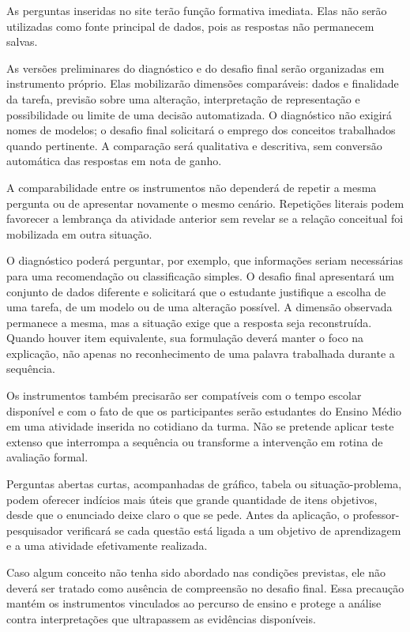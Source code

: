 As perguntas inseridas no site terão função formativa imediata. Elas não serão utilizadas como fonte principal de dados, pois as respostas não permanecem salvas.

As versões preliminares do diagnóstico e do desafio final serão organizadas em instrumento próprio. Elas mobilizarão dimensões comparáveis: dados e finalidade da tarefa, previsão sobre uma alteração, interpretação de representação e possibilidade ou limite de uma decisão automatizada. O diagnóstico não exigirá nomes de modelos; o desafio final solicitará o emprego dos conceitos trabalhados quando pertinente. A comparação será qualitativa e descritiva, sem conversão automática das respostas em nota de ganho.

A comparabilidade entre os instrumentos não dependerá de repetir a mesma pergunta ou de apresentar novamente o mesmo cenário. Repetições literais podem favorecer a lembrança da atividade anterior sem revelar se a relação conceitual foi mobilizada em outra situação.

O diagnóstico poderá perguntar, por exemplo, que informações seriam necessárias para uma recomendação ou classificação simples. O desafio final apresentará um conjunto de dados diferente e solicitará que o estudante justifique a escolha de uma tarefa, de um modelo ou de uma alteração possível. A dimensão observada permanece a mesma, mas a situação exige que a resposta seja reconstruída. Quando houver item equivalente, sua formulação deverá manter o foco na explicação, não apenas no reconhecimento de uma palavra trabalhada durante a sequência.

Os instrumentos também precisarão ser compatíveis com o tempo escolar disponível e com o fato de que os participantes serão estudantes do Ensino Médio em uma atividade inserida no cotidiano da turma. Não se pretende aplicar teste extenso que interrompa a sequência ou transforme a intervenção em rotina de avaliação formal.

Perguntas abertas curtas, acompanhadas de gráfico, tabela ou situação-problema, podem oferecer indícios mais úteis que grande quantidade de itens objetivos, desde que o enunciado deixe claro o que se pede. Antes da aplicação, o professor-pesquisador verificará se cada questão está ligada a um objetivo de aprendizagem e a uma atividade efetivamente realizada.

Caso algum conceito não tenha sido abordado nas condições previstas, ele não deverá ser tratado como ausência de compreensão no desafio final. Essa precaução mantém os instrumentos vinculados ao percurso de ensino e protege a análise contra interpretações que ultrapassem as evidências disponíveis.

